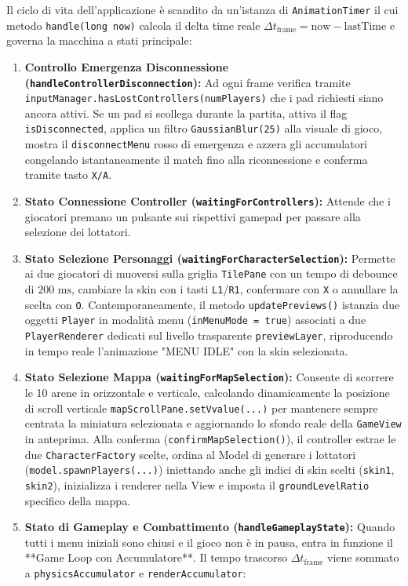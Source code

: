 \documentclass[11pt, a4paper]{article}
\begin{document}
Il ciclo di vita dell'applicazione è scandito da un'istanza di \texttt{AnimationTimer} il cui metodo \texttt{handle(long now)} calcola il delta time reale $\Delta t_{\text{frame}} = \text{now} - \text{lastTime}$ e governa la macchina a stati principale:
\begin{enumerate}
    \item \textbf{Controllo Emergenza Disconnessione (\texttt{handleControllerDisconnection}):} Ad ogni frame verifica tramite \texttt{inputManager.hasLostControllers(numPlayers)} che i pad richiesti siano ancora attivi. Se un pad si scollega durante la partita, attiva il flag \texttt{isDisconnected}, applica un filtro \texttt{GaussianBlur(25)} alla visuale di gioco, mostra il \texttt{disconnectMenu} rosso di emergenza e azzera gli accumulatori congelando istantaneamente il match fino alla riconnessione e conferma tramite tasto \texttt{X/A}.
    \item \textbf{Stato Connessione Controller (\texttt{waitingForControllers}):} Attende che i giocatori premano un pulsante sui rispettivi gamepad per passare alla selezione dei lottatori.
    \item \textbf{Stato Selezione Personaggi (\texttt{waitingForCharacterSelection}):} Permette ai due giocatori di muoversi sulla griglia \texttt{TilePane} con un tempo di debounce di $200\text{ ms}$, cambiare la skin con i tasti \texttt{L1}/\texttt{R1}, confermare con \texttt{X} o annullare la scelta con \texttt{O}. Contemporaneamente, il metodo \texttt{updatePreviews()} istanzia due oggetti \texttt{Player} in modalità menu (\texttt{inMenuMode = true}) associati a due \texttt{PlayerRenderer} dedicati sul livello trasparente \texttt{previewLayer}, riproducendo in tempo reale l'animazione "MENU IDLE" con la skin selezionata.
    \item \textbf{Stato Selezione Mappa (\texttt{waitingForMapSelection}):} Consente di scorrere le 10 arene in orizzontale e verticale, calcolando dinamicamente la posizione di scroll verticale \texttt{mapScrollPane.setVvalue(...)} per mantenere sempre centrata la miniatura selezionata e aggiornando lo sfondo reale della \texttt{GameView} in anteprima. Alla conferma (\texttt{confirmMapSelection()}), il controller estrae le due \texttt{CharacterFactory} scelte, ordina al Model di generare i lottatori (\texttt{model.spawnPlayers(...)}) iniettando anche gli indici di skin scelti (\texttt{skin1}, \texttt{skin2}), inizializza i renderer nella View e imposta il \texttt{groundLevelRatio} specifico della mappa.
    \item \textbf{Stato di Gameplay e Combattimento (\texttt{handleGameplayState}):} Quando tutti i menu iniziali sono chiusi e il gioco non è in pausa, entra in funzione il **Game Loop con Accumulatore**. Il tempo trascorso $\Delta t_{\text{frame}}$ viene sommato a \texttt{physicsAccumulator} e \texttt{renderAccumulator}:

\end{enumerate}
\end{document}
